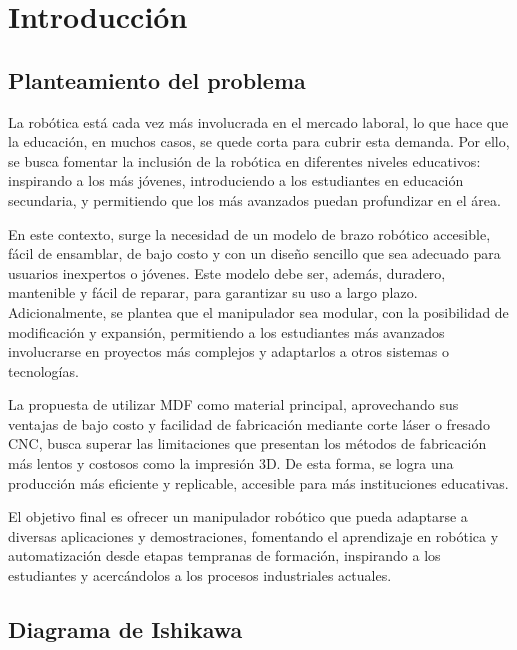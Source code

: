 \section{Introducción}
\subsection{Planteamiento del problema}

La robótica está cada vez más involucrada en el mercado laboral, lo que hace que la educación, en muchos casos, se quede corta para cubrir esta demanda. Por ello, se busca fomentar la inclusión de la robótica en diferentes niveles educativos: inspirando a los más jóvenes, introduciendo a los estudiantes en educación secundaria, y permitiendo que los más avanzados puedan profundizar en el área.

En este contexto, surge la necesidad de un modelo de brazo robótico accesible, fácil de ensamblar, de bajo costo y con un diseño sencillo que sea adecuado para usuarios inexpertos o jóvenes. Este modelo debe ser, además, duradero, mantenible y fácil de reparar, para garantizar su uso a largo plazo. Adicionalmente, se plantea que el manipulador sea modular, con la posibilidad de modificación y expansión, permitiendo a los estudiantes más avanzados involucrarse en proyectos más complejos y adaptarlos a otros sistemas o tecnologías.

La propuesta de utilizar MDF como material principal, aprovechando sus ventajas de bajo costo y facilidad de fabricación mediante corte láser o fresado CNC, busca superar las limitaciones que presentan los métodos de fabricación más lentos y costosos como la impresión 3D. De esta forma, se logra una producción más eficiente y replicable, accesible para más instituciones educativas.

El objetivo final es ofrecer un manipulador robótico que pueda adaptarse a diversas aplicaciones y demostraciones, fomentando el aprendizaje en robótica y automatización desde etapas tempranas de formación, inspirando a los estudiantes y acercándolos a los procesos industriales actuales.

\subsection{Diagrama de Ishikawa}

\vspace{1em}


